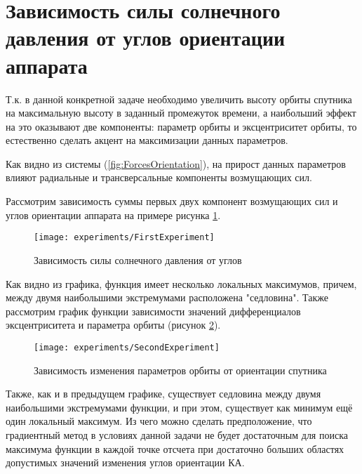 \section{Зависимость силы солнечного давления от углов ориентации аппарата}
\noindent\indent Т.к. в данной конкретной задаче необходимо увеличить высоту орбиты
спутника на максимальную высоту в заданный промежуток времени, а наибольший эффект
на это оказывают две компоненты: параметр орбиты и эксцентриситет орбиты, то естественно
сделать акцент на максимизации данных параметров.\par
    Как видно из системы (\ref{fig:ForcesOrientation}), на прирост данных параметров
влияют радиальные и трансверсальные компоненты возмущающих сил.\par
    Рассмотрим зависимость суммы первых двух компонент возмущающих сил и углов ориентации аппарата на
примере рисунка \ref{fig:Force2Angles}.
\begin{figure}[!h]
  \centering
  \texttt{[image: experiments/FirstExperiment]}
  \caption{Зависимость силы солнечного давления от углов}
  \label{fig:Force2Angles}
\end{figure}\par
    Как видно из графика, функция имеет несколько локальных максимумов, причем,
между двумя наибольшими экстремумами расположена "седловина". Также
рассмотрим график функции зависимости значений дифференциалов эксцентриситета и
параметра орбиты (рисунок \ref{fig:KeplerParams2Angles}).
\begin{figure}[!h]
  \centering
  \texttt{[image: experiments/SecondExperiment]}
  \caption{Зависимость изменения параметров орбиты от ориентации спутника}
  \label{fig:KeplerParams2Angles}
\end{figure}\par
    Также, как и в предыдущем графике, существует седловина между двумя наибольшими
экстремумами функции, и при этом, существует как минимум ещё один локальный максимум.
    Из чего можно сделать предположение, что градиентный метод в условиях данной
задачи не будет достаточным для поиска максимума функции в каждой точке отсчета
при достаточно больших областях допустимых значений изменения углов ориентации КА.
